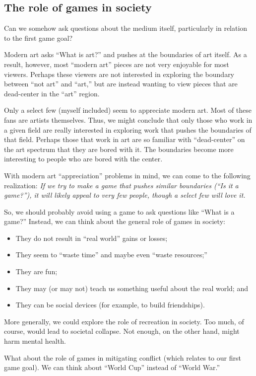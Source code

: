 \documentclass[12pt]{article}
\begin{document}
\subsection{The role of games in society}

Can we somehow ask questions about the medium itself, particularly in relation to the first game goal?

Modern art asks ``What is art?'' and pushes at the boundaries of art itself.
As a result, however, most ``modern art'' pieces are not very enjoyable for most viewers.
Perhaps these viewers are not interested in exploring the boundary between ``not art'' and ``art,'' but are instead wanting to view pieces that are dead-center in the ``art'' region.

Only a select few (myself included) seem to appreciate modern art.
Most of these fans are artists themselves. 
Thus, we might conclude that only those who work in a given field are really interested in exploring work that pushes the boundaries of that field.
Perhaps those that work in art are so familiar with ``dead-center'' on the art spectrum that they are bored with it.
The boundaries become more interesting to people who are bored with the center.

With modern art ``appreciation'' problems in mind, we can come to the following realization:  
{\em If we try to make a game that pushes similar boundaries (``Is it a game?''), it will likely appeal to very few people, though a select few will love it.}

So, we should probably avoid using a game to ask questions like ``What is a game?''
Instead, we can think about the general role of games in society:
\begin{itemize}
\item They do not result in ``real world'' gains or losses;
\item They seem to ``waste time'' and maybe even ``waste resources;''
\item They are fun;
\item They may (or may not) teach us something useful about the real world; and
\item They can be social devices (for example, to build friendships).
\end{itemize}
More generally, we could explore the role of recreation in society.  
Too much, of course, would lead to societal collapse.  
Not enough, on the other hand, might harm mental health.

What about the role of games in mitigating conflict (which relates to our first game goal).
We can think about ``World Cup'' instead of ``World War.''
\end{document}
